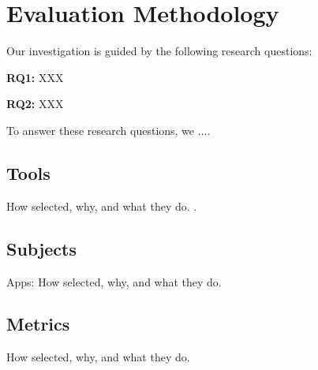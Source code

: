 \section{Evaluation Methodology}
\label{sec:eval}
Our investigation is guided by the following research questions:

\noindent 
{\bf RQ1:} XXX

\noindent 
{\bf RQ2:} XXX

To answer these research questions, we ....
 

\subsection{Tools}

How selected, why, and what they do. . 

\subsection{Subjects}

Apps: How selected, why, and what they do.

\subsection{Metrics}

How selected, why, and what they do.